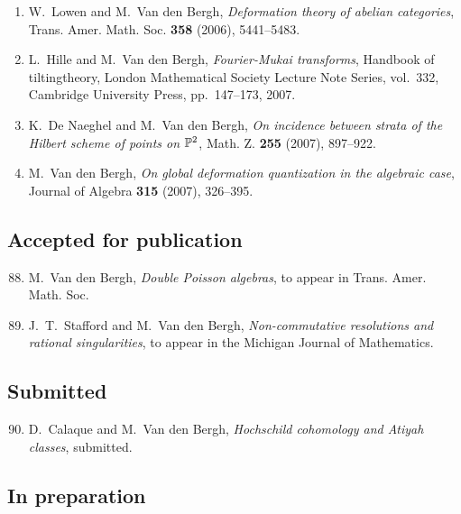 \begin{enumerate}
\item
W.~Lowen and M.~Van den Bergh, {\em Deformation theory of abelian categories}, Trans. Amer. Math. Soc. {\bf 358} (2006), 5441--5483.

\item
L.~Hille and M.~Van den Bergh, {\em Fourier-Mukai transforms}, Handbook of tiltingtheory, London Mathematical Society Lecture Note Series, vol.~332, Cambridge University Press, pp.~147--173, 2007.

\item
K.~De Naeghel and M.~Van den Bergh, {\em On incidence between strata of the Hilbert scheme of points on $\mathbb P\sp 2$}, Math. Z. {\bf 255} (2007), 897--922.

\item
M.~Van den Bergh, {\em On global deformation quantization in the algebraic case}, Journal of Algebra {\bf 315} (2007), 326--395.

\end{enumerate}


\subsection*{Accepted for publication}

\begin{enumerate}
\setcounter{enumi}{87}
\item
M.~Van den Bergh, {\em Double Poisson algebras}, to appear in Trans. Amer. Math. Soc.

\item
J.~T.~Stafford and M.~Van den Bergh, {\em Non-commutative resolutions and rational singularities}, to appear in the Michigan Journal of Mathematics.

\end{enumerate}


\subsection*{Submitted}

\begin{enumerate}
\setcounter{enumi}{89}
\item
D.~Calaque and M.~Van den Bergh, {\em Hochschild cohomology and Atiyah classes}, submitted.

\end{enumerate}


\subsection*{In preparation}

